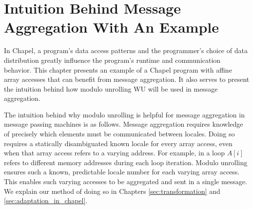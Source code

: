 
\renewcommand{\thechapter}{5}

\chapter{Intuition Behind Message Aggregation With An Example}\label{sec:motivation_for_aggregation} 


In Chapel, a program's data access patterns and the programmer's choice of data distribution greatly influence the program's runtime and communication behavior. This chapter presents an example of a Chapel program with affine array accesses that can benefit from message aggregation. It also serves to present the intuition behind how modulo unrolling WU will be used in message aggregation. 

The intuition behind why modulo unrolling is helpful for message aggregation in message passing machines is as follows. Message aggregation requires knowledge of precisely which elements must be communicated between locales. Doing so requires a statically disambiguated known locale for every array access, even when that array access refers to a varying address. For example, in a loop $A[i]$ refers to different memory addresses during each loop iteration. Modulo unrolling ensures such a known, predictable locale number for each varying array access. This enables such varying accesses to be aggregated and sent in a single message. We explain our method of doing so in Chapters \ref{sec:transformation} and \ref{sec:adaptation_in_chapel}.

